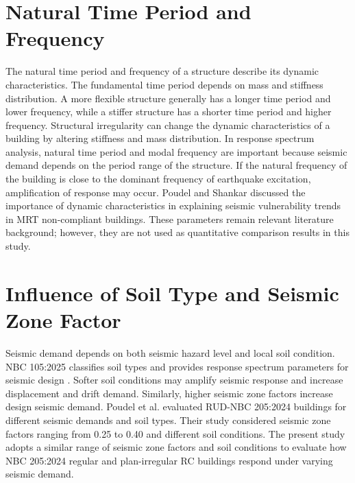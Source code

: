 \section{Natural Time Period and Frequency}
The natural time period and frequency of a structure describe its dynamic characteristics. The fundamental time period depends on mass and stiffness distribution. A more flexible structure generally has a longer time period and lower frequency, while a stiffer structure has a shorter time period and higher frequency. Structural irregularity can change the dynamic characteristics of a building by altering stiffness and mass distribution.
In response spectrum analysis, natural time period and modal frequency are important because seismic demand depends on the period range of the structure. If the natural frequency of the building is close to the dominant frequency of earthquake excitation, amplification of response may occur. Poudel and Shankar \cite{poudel2017seismic} discussed the importance of dynamic characteristics in explaining seismic vulnerability trends in MRT non-compliant buildings. These parameters remain relevant literature background; however, they are not used as quantitative comparison results in this study.
\section{Influence of Soil Type and Seismic Zone Factor}
Seismic demand depends on both seismic hazard level and local soil condition. NBC 105:2025 classifies soil types and provides response spectrum parameters for seismic design \cite{nbc105_2025}. Softer soil conditions may amplify seismic response and increase displacement and drift demand. Similarly, higher seismic zone factors increase design seismic demand.
Poudel et al. \cite{poudel2025seismic} evaluated RUD-NBC 205:2024 buildings for different seismic demands and soil types. Their study considered seismic zone factors ranging from 0.25 to 0.40 and different soil conditions. The present study adopts a similar range of seismic zone factors and soil conditions to evaluate how NBC 205:2024 regular and plan-irregular RC buildings respond under varying seismic demand.
